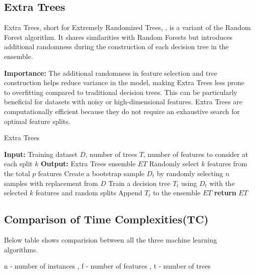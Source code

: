 \subsection{Extra Trees}{
Extra Trees, short for Extremely Randomized Trees, \cite{geurts2006extremely}, is a variant of the Random Forest algorithm. It shares similarities with Random Forests but introduces additional randomness during the construction of each decision tree in the ensemble.

\par \textbf{Importance:}
The additional randomness in feature selection and tree construction helps reduce variance in the model, making Extra Trees less prone to overfitting compared to traditional decision trees. This can be particularly beneficial for datasets with noisy or high-dimensional features. Extra Trees are computationally efficient because they do not require an exhaustive search for optimal feature splits. 

\begin{algorithm}
\caption{Extra Trees}
\label{alg:extra_trees}
\begin{algorithmic}[1]
\Statex \textbf{Input:} Training dataset $D$, number of trees $T$, number of features to consider at each split $k$
\Statex \textbf{Output:} Extra Trees ensemble $ET$
    \State Randomly select $k$ features from the total $p$ features
    \State Create a bootstrap sample $D_t$ by randomly selecting $n$ samples with replacement from $D$
    \State Train a decision tree $T_t$ using $D_t$ with the selected $k$ features and random splits
    \State Append $T_t$ to the ensemble $ET$
\EndFor
\State \textbf{return} $ET$
\end{algorithmic}
\end{algorithm}
}

\pagebreak

\subsection{Comparison of Time Complexities(TC)}
Below table shows comparision between all the three machine learning algorithms.

n - number of instances , 
f - number of features , 
t - number of trees

\begin{table}[htbp]
    \centering
    \caption{Comparison of TC of Tree-based ML algorithms}
\end{table}


